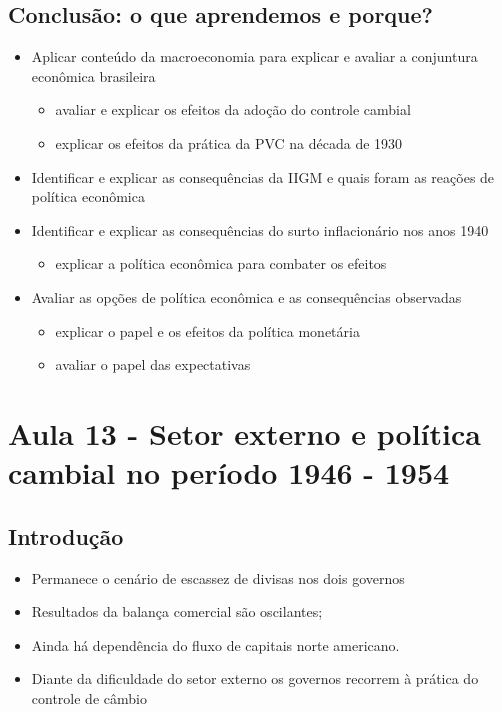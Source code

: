 \documentclass[a4paper,12pt]{article}[abntex2]
\begin{document}
\subsection{Conclusão: o que aprendemos e porque?}
\begin{itemize}
    \item Aplicar conteúdo da macroeconomia para explicar e avaliar a conjuntura econômica brasileira
    \begin{itemize}
        \item avaliar e explicar os efeitos da adoção do controle cambial
        \item explicar os efeitos da prática da PVC na década de 1930
    \end{itemize}
    \item Identificar e explicar as consequências da IIGM e quais foram as reações de política econômica
\item  Identificar e explicar as consequências do surto inflacionário nos anos 1940
\begin{itemize}
    \item explicar a política econômica para combater os efeitos 
\end{itemize}
\item Avaliar as opções de política econômica e as consequências observadas
\begin{itemize}
    \item explicar o papel e os efeitos da política monetária
    \item avaliar o papel das expectativas
\end{itemize}
\end{itemize}

\section{\textbf{Aula 13 - Setor externo e política cambial no período 1946 - 1954}}

\subsection{Introdução}
\begin{itemize}
    \item Permanece o cenário de escassez de divisas nos dois governos
\end{itemize}
\begin{itemize}
    \begin{itemize}
        \item Resultados da balança comercial são oscilantes;
    \end{itemize}
\end{itemize}
\begin{itemize}
    \begin{itemize}
        \item Ainda há dependência do fluxo de capitais norte americano.
    \end{itemize}
\end{itemize}
\begin{itemize}
    \item Diante da dificuldade do setor externo os governos recorrem à prática do controle de câmbio
\end{itemize}
\end{document}
